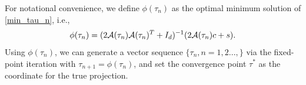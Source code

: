 \documentclass{article}
\newtheorem{theorem}{Theorem}[section]
\theoremstyle{remark}
\begin{document}
For notational convenience, we define $\phi(\tau_{n})$ as the optimal minimum solution of \eqref{min_tau_n}, i.e.,
\[
\phi(\tau_{n})=( 2{\cal A}(\tau_{n}){\cal A}(\tau_{n})^T+ I_d)^{-1} (2{\cal A}(\tau_{n})c+ s).
\]
Using $\phi(\tau_n)$, we can generate a vector sequence $\{\tau_n, n = 1,2...,\}$ via the fixed-point iteration with
$\tau_{n+1} = \phi(\tau_n)$, and set the convergence point $\tau^*$ as the coordinate for the true projection.
\end{document}
